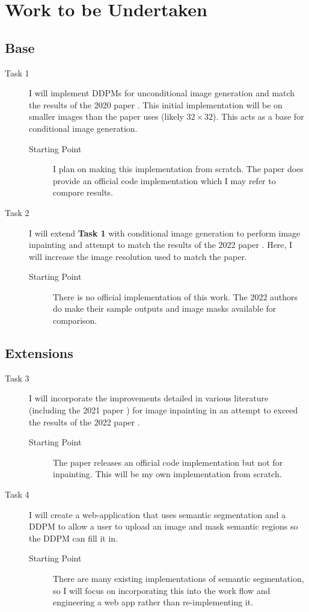 \documentclass{article}
\begin{document}
\section{Work to be Undertaken}

\subsection{Base}

\begin{description}
\item[Task 1] I will implement DDPMs for unconditional image generation and match the results of the 2020 paper \cite{Ho-2020}. This initial implementation will be on smaller images than the paper uses (likely $32 \times 32$). This acts as a base for conditional image generation.
\begin{description}
\item[Starting Point] I plan on making this implementation from scratch. The paper does provide an official code implementation which I may refer to compare results.
\end{description}
\item[Task 2] I will extend \textbf{Task 1} with conditional image generation to perform image inpainting and attempt to match the results of the 2022 paper \cite{Saharia-2022}. Here, I will increase the image resolution used to match the paper.
\begin{description}
\item[Starting Point] There is no official implementation of this work. The 2022 authors do make their sample outputs and image masks available for comparison.
\end{description}
\end{description}

\subsection{Extensions}
\begin{description}
\item[Task 3] I will incorporate the improvements detailed in various literature (including the 2021 paper \cite{Nichol-2021}) for image inpainting in an attempt to exceed the results of the 2022 paper \cite{Saharia-2022}.
\begin{description}
\item[Starting Point] The paper releases an official code implementation but not for inpainting. This will be my own implementation from scratch.
\end{description}
\item[Task 4] I will create a web-application that uses semantic segmentation and a DDPM to allow a user to upload an image and mask semantic regions so the DDPM can fill it in.
\begin{description}
\item[Starting Point] There are many existing implementations of semantic segmentation, so I will focus on incorporating this into the work flow and engineering a web app rather than re-implementing it.
\end{description}
\end{description}
\end{document}
